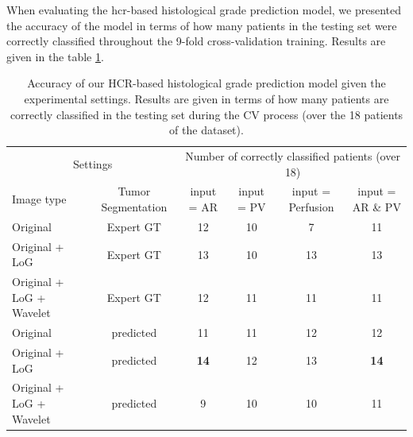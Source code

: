 \documentclass[]{article}
\renewcommand{\arraystretch}{5}
\begin{document}
When evaluating the \ac{hcr}-based histological grade prediction model, we presented the accuracy of the model in terms of how many patients in the testing set were correctly classified throughout the 9-fold cross-validation training. Results are given in the table \ref{tab:hcrGrade}.
\renewcommand{\arraystretch}{2}
\begin{table}[!htp]
	\centering
	\caption{Accuracy of our HCR-based histological grade prediction model given the experimental settings. Results are given in terms of how many patients are correctly classified in the testing set during the CV process (over the 18 patients of the dataset).}\label{tab:hcrGrade}
	\scriptsize
	\begin{tabular}{lccccc}\toprule
		\multicolumn{2}{c}{Settings} &\multicolumn{4}{c}{Number of correctly classified patients (over 18)} \\\cmidrule{1-6}
		Image type &Tumor Segmentation & input = AR &input = PV &input = Perfusion & input = AR \& PV \\\midrule
		Original & Expert GT & 12  & 10  & 7 & 11 \\
		Original + LoG & Expert GT & 13  & 10  & 13 & 13 \\
		Original + LoG + Wavelet & Expert GT & 12  & 11  & 11 & 11 \\
		Original & predicted & 11  & 11  & 12 & 12 \\
		Original + LoG & predicted & \textbf{14}  & 12  & 13 & \textbf{14} \\
		Original + LoG + Wavelet & predicted & 9  & 10  & 10 & 11 \\
		\bottomrule
	\end{tabular}
\end{table}
\renewcommand{\arraystretch}{5}
\end{document}
